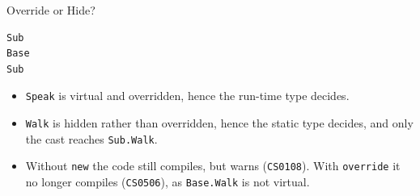 \begin{solutionframe}{Override or Hide?}
  \begin{lstlisting}[language={},basicstyle=\scriptsize\ttfamily]
Sub
Base
Sub
  \end{lstlisting}
  \begin{itemize}
    \item \texttt{Speak} is virtual and overridden, hence the run-time type
      decides.
    \item \texttt{Walk} is hidden rather than overridden, hence the static type
      decides, and only the cast reaches \texttt{Sub.Walk}.
    \item Without \texttt{new} the code still compiles, but warns
      (\texttt{CS0108}). With \texttt{override} it no longer compiles
      (\texttt{CS0506}), as \texttt{Base.Walk} is not virtual.
  \end{itemize}
  \vspace{4ex}

\end{solutionframe}

